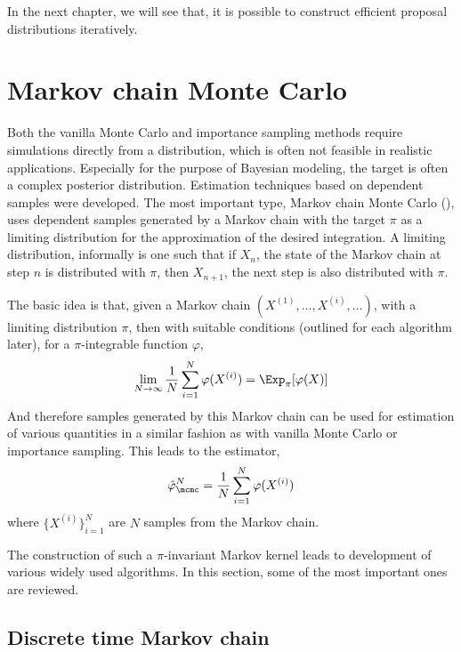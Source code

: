 In the next chapter, we will see that, it is possible to construct efficient
proposal distributions iteratively.

\section{Markov chain Monte Carlo}
\label{sec:Markov chain Monte Carlo}

Both the vanilla Monte Carlo and importance sampling methods require
simulations directly from a distribution, which is often not feasible in
realistic applications. Especially for the purpose of Bayesian modeling, the
target is often a complex posterior distribution. Estimation techniques based
on dependent samples were developed. The most important type, Markov chain
Monte Carlo (\mcmc), uses dependent samples generated by a Markov chain with
the target $\pi$ as a limiting distribution for the approximation of the
desired integration. A limiting distribution, informally is one such that if
$X_n$, the state of the Markov chain at step $n$ is distributed with $\pi$,
then $X_{n+1}$, the next step is also distributed with $\pi$.

The basic idea is that, given a Markov chain $(X^{(1)},\dots,X^{(i)},\dots)$,
with a limiting distribution $\pi$, then with suitable conditions (outlined
for each algorithm later), for a $\pi$-integrable function $\varphi$,
\begin{equation}
  \lim_{N\to\infty}\frac{1}{N}\sum_{i=1}^N\varphi(X^{(i)}) =
  \Exp_{\pi}[\varphi(X)]
  \label{eq:mcmc convergence}
\end{equation}
And therefore samples generated by this Markov chain can be used for
estimation of various quantities in a similar fashion as with vanilla Monte
Carlo or importance sampling. This leads to the estimator,
\begin{equation}
  \hat\varphi_{\mcmc}^N = \frac{1}{N}\sum_{i=1}^N\varphi(X^{(i)})
  \label{eq:mcmc est}
\end{equation}
where $\{X^{(i)}\}_{i=1}^N$ are $N$ samples from the Markov chain.

The construction of such a $\pi$-invariant Markov kernel leads to development
of various widely used \mcmc algorithms. In this section, some of the most
important ones are reviewed.

\subsection{Discrete time Markov chain}
\label{sub:Discrete time Markov chain}


